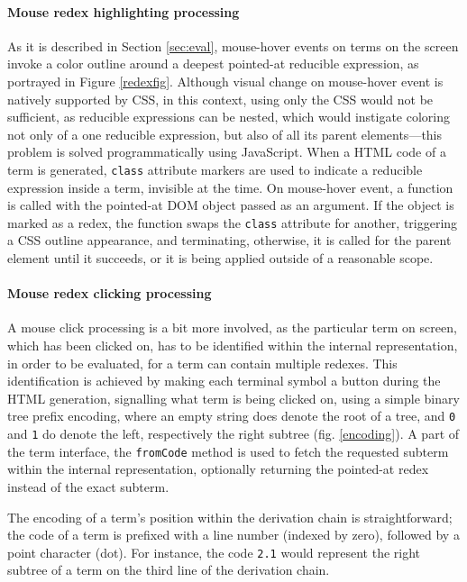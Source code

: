 \documentclass[table, a4paper, 10pt]{article}
\begin{document}
\paragraph{Mouse redex highlighting processing}
As it is described in Section \ref{sec:eval}, mouse-hover events on terms on the screen
invoke a color outline around a deepest pointed-at reducible expression, as
portrayed in Figure \ref{redexfig}. Although visual
change on mouse-hover event is natively supported by CSS,
in this context, using only the CSS would not be sufficient, as
reducible expressions can be nested, which would
instigate coloring not only of a one reducible expression, but also
of all its parent elements---this problem is solved
programmatically using JavaScript. When a HTML code of a term is 
generated, \texttt{class} attribute markers are used to indicate a reducible expression
inside a term,
invisible at the time. On mouse-hover event, a function is called with
the pointed-at DOM object passed as an argument. If the object is marked
as a redex, the function swaps the \texttt{class} attribute for another,
triggering a CSS outline appearance, and terminating, otherwise, it is called for the parent element
until it succeeds, or it is being applied outside of a reasonable scope.

\paragraph{Mouse redex clicking processing}
A mouse click processing is a bit more involved, as the particular
term on screen, which has been clicked on, has to be identified
within the internal representation,
in order to be evaluated, for a term can contain multiple redexes. This identification is achieved by
making each terminal symbol a button during the HTML generation,
signalling what term is being clicked on, using a simple binary tree
prefix encoding, where an empty string does denote the root of a tree,
and \texttt{0} and \texttt{1} do denote the left, respectively the right subtree (fig. \ref{encoding}).
A part of the term interface, the \texttt{fromCode} method is used
to fetch the requested subterm within the internal representation, optionally
returning the pointed-at redex instead of the exact subterm.

The encoding of a term's position within the derivation chain is straightforward;
the code of a term is prefixed with a line number (indexed by zero), followed by a point character (dot). For instance,
the code \texttt{2.1} would represent the right subtree of a term on the third line
of the derivation chain.
\end{document}
